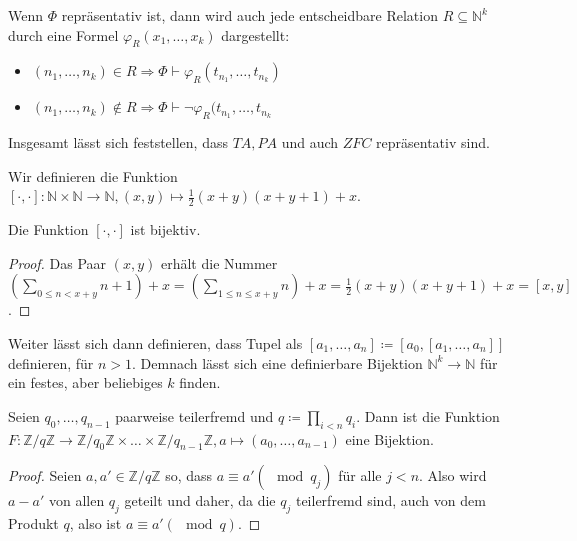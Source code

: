 Wenn $\Phi$ repräsentativ ist, dann wird auch jede entscheidbare Relation $R\subseteq\mathbb{N}^k$ durch eine Formel $\varphi_R(x_1,\dots,x_k)$ dargestellt:
\begin{itemize}
	\item $(n_1,\dots,n_k)\in R \Rightarrow \Phi\vdash\varphi_R(t_{n_1},\dots,t_{n_k})$
	\item $(n_1,\dots,n_k)\notin R \Rightarrow \Phi\vdash\neg\varphi_R(t_{n_1},\dots,t_{n_k}$
\end{itemize}

Insgesamt lässt sich feststellen, dass $TA, PA$ und auch $ZFC$ repräsentativ sind.

\begin{definition}
	Wir definieren die Funktion $[\cdot,\cdot]:\mathbb{N}\times\mathbb{N}\to\mathbb{N}, (x,y)\mapsto\frac{1}{2}(x+y)(x+y+1)+x$.
\end{definition}
\begin{lemma}
	Die Funktion $[\cdot,\cdot]$ ist bijektiv.
\end{lemma}
\begin{proof}
	Das Paar $(x,y)$ erhält die Nummer $(\sum\limits_{0\leq n < x+y}n+1)+x=(\sum\limits_{1\leq n \leq x+y}n)+x=\frac{1}{2}(x+y)(x+y+1)+x=[x,y]$.
\end{proof}

Weiter lässt sich dann definieren, dass Tupel als $[a_1,\dots,a_n]\coloneqq[a_0,[a_1,\dots,a_n]]$ definieren, für $n>1$. Demnach lässt sich eine definierbare Bijektion $\mathbb{N}^k\to \mathbb{N}$ für ein festes, aber beliebiges $k$ finden.

\begin{satz}
	Seien $q_0,\dots,q_{n-1}$ paarweise teilerfremd und $q\coloneqq\prod\limits_{i<n} q_i$. Dann ist die Funktion $F:\mathbb{Z}/ q\mathbb{Z} \to \mathbb{Z}/q_0\mathbb{Z} \times \dots \times \mathbb{Z}/q_{n-1}\mathbb{Z}, a\mapsto(a_0,\dots,a_{n-1})$ eine Bijektion.
\end{satz}
\begin{proof}
	Seien $a,a'\in \mathbb{Z}/q\mathbb{Z}$ so, dass $a\equiv a' (\mod q_j)$ für alle $j<n$. Also wird $a-a'$ von allen $q_j$ geteilt und daher, da die $q_j$ teilerfremd sind, auch von dem Produkt $q$, also ist $a\equiv a'(\mod q)$.
\end{proof}

